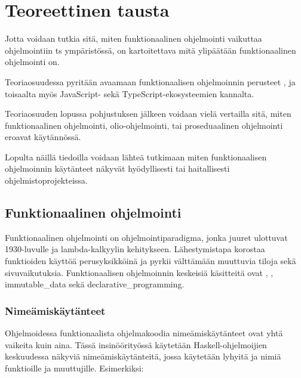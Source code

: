 \vspace{21.5pt}
\chapter{Teoreettinen tausta}

Jotta voidaan tutkia sitä, miten funktionaalinen ohjelmointi vaikuttaa ohjelmointiin \gls{ts} ympäristössä, on kartoitettava mitä ylipäätään funktionaalinen ohjelmointi on.

Teoriaosuudessa pyritään avaamaan funktionaalisen ohjelmoinnin perusteet , ja toisaalta myös JavaScript- sekä TypeScript-ekosysteemien kannalta.

Teoriaosuuden lopussa pohjustuksen jälkeen voidaan vielä vertailla sitä, miten funktionaalinen ohjelmointi, olio-ohjelmointi, tai proseduaalinen ohjelmointi eroavat käytännössä.

Lopulta näillä tiedoilla voidaan lähteä tutkimaan miten funktionaalisen ohjelmoinnin käytänteet näkyvät hyödyllisesti tai haitallisesti ohjelmistoprojekteissa.

\section{Funktionaalinen ohjelmointi}

Funktionaalinen ohjelmointi on ohjelmointiparadigma, jonka juuret ulottuvat 1930-luvulle ja lambda-kalkyylin kehitykseen. Lähestymistapa korostaa funktioiden käyttöä perusyksikköinä ja pyrkii välttämään muuttuvia tiloja sekä sivuvaikutuksia. Funktionaalisen ohjelmoinnin keskeisiä käsitteitä ovat , , \gls{immutable_data} sekä \gls{declarative_programming}. \citep{Tan2004,computerphile_lambda}

\subsection{Nimeämiskäytänteet}

Ohjelmoidessa funktionaalista ohjelmakoodia nimeämiskäytänteet ovat yhtä vaikeita kuin aina. Tässä insinöörityössä käytetään Haskell-ohjelmoijien keskuudessa näkyviä nimeämiskäytänteitä, jossa käytetään lyhyitä ja  nimiä funktioille ja muuttujille. Esimerkiksi:

